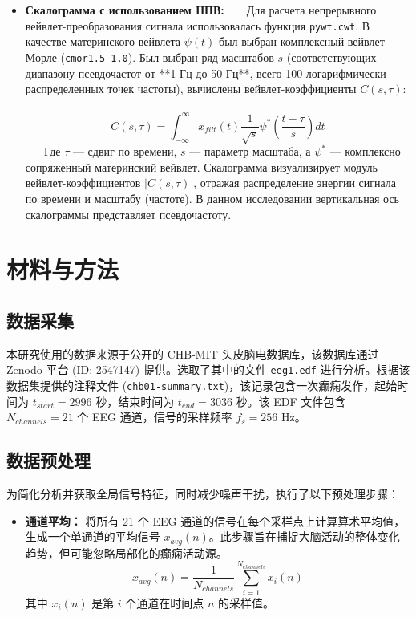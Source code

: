 \documentclass{article}
\providecommand{\pcsync}{\par\vspace{\baselineskip}} %
\begin{document}
\begin{paracol}{2}
\begin{itemize}
    \item \textbf{Скалограмма с использованием НПВ:}
    Для расчета непрерывного вейвлет-преобразования сигнала использовалась функция \texttt{pywt.cwt}. В качестве материнского вейвлета $\psi(t)$ был выбран комплексный вейвлет Морле (\texttt{cmor1.5-1.0}). Был выбран ряд масштабов $s$ (соответствующих диапазону псевдочастот от **1 Гц до 50 Гц**, всего 100 логарифмически распределенных точек частоты), вычислены вейвлет-коэффициенты $C(s, \tau)$:
    \[ C(s, \tau) = \int_{-\infty}^{\infty} x_{filt}(t) \frac{1}{\sqrt{s}} \psi^*\left(\frac{t-\tau}{s}\right) dt \]
    Где $\tau$ — сдвиг по времени, $s$ — параметр масштаба, а $\psi^*$ — комплексно сопряженный материнский вейвлет. Скалограмма визуализирует модуль вейвлет-коэффициентов $|C(s, \tau)|$, отражая распределение энергии сигнала по времени и масштабу (частоте). В данном исследовании вертикальная ось скалограммы представляет псевдочастоту. %
\end{itemize}

\switchcolumn

\section{材料与方法}
\pcsync

\subsection{数据采集} %
本研究使用的数据来源于公开的 CHB-MIT 头皮脑电数据库，该数据库通过 Zenodo 平台 (ID: 2547147) \cite{Shoeb2009} 提供。选取了其中的文件 \texttt{eeg1.edf} 进行分析。根据该数据集提供的注释文件 (\texttt{chb01-summary.txt})，该记录包含一次癫痫发作，起始时间为 $t_{start} = 2996$ 秒，结束时间为 $t_{end} = 3036$ 秒。该 EDF 文件包含 $N_{channels} = 21$ 个 EEG 通道，信号的采样频率 $f_s = 256$ Hz。%

\subsection{数据预处理} %

为简化分析并获取全局信号特征，同时减少噪声干扰，执行了以下预处理步骤：

\begin{itemize}
 \item \textbf{通道平均：} 将所有 21 个 EEG 通道的信号在每个采样点上计算算术平均值，生成一个单通道的平均信号 $x_{avg}(n)$。此步骤旨在捕捉大脑活动的整体变化趋势，但可能忽略局部化的癫痫活动源。
 \[ x_{avg}(n) = \frac{1}{N_{channels}} \sum_{i=1}^{N_{channels}} x_i(n) \]
 其中 $x_i(n)$ 是第 $i$ 个通道在时间点 $n$ 的采样值。


\end{itemize}
\end{paracol}
\end{document}
